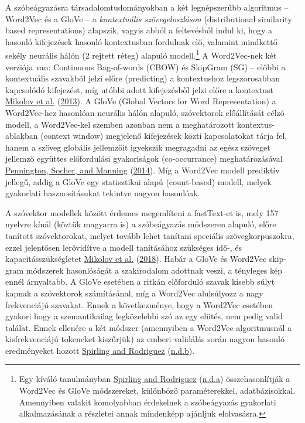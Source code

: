 \documentclass[
]{book}
\begin{document}
A szóbeágyazásra társadalomtudományokban a két legnépszerűbb algoritmus
-- Word2Vec és a GloVe -- a \emph{kontextuális szövegeloszláson}
(distributional similarity based representations) alapszik, vagyis abból
a feltevésből indul ki, hogy a hasonló kifejezések hasonló kontextusban
fordulnak elő, valamint mindkettő sekély neurális hálón (2 rejtett
réteg) alapuló modell.\footnote{Egy kíváló tanulmányban
  \protect\hyperlink{ref-spirlingword}{Spirling and Rodriguez}
  (\protect\hyperlink{ref-spirlingword}{n.d.a}) összehasonlítják a
  Word2Vec és GloVe módszereket, különbözö paraméterekkel,
  adatbázisokkal. Amennyiben valakit komolyabban érdekelnek a
  szóbeágyazás gyakorlati alkalmazásának a részletei annak mindenképp
  ajánljuk elolvasásra.} A Word2Vec-nek két verziója van: Continuous
Bag-of-words (CBOW) és SkipGram (SG) -- előbbi a kontextuális szavakból
jelzi előre (predicting) a kontextushoz legszorosabban kapcsolódó
kifejezést, míg utóbbi adott kifejezésből jelzi előre a kontextust
\protect\hyperlink{ref-mikolov2013efficient}{Mikolov et al.}
(\protect\hyperlink{ref-mikolov2013efficient}{2013}). A GloVe (Global
Vectors for Word Representation) a Word2Vec-hez hasonlóan neurális hálón
alapuló, szóvektorok előállítását célzó modell, a Word2Vec-kel szemben
azonban nem a meghatározott kontextus-ablakban (context window)
megjelenő kifejezések közti kapcsolatokat tárja fel, hanem a szöveg
globális jellemzőit igyekszik megragadni az egész szöveget jellemző
együttes előfordulási gyakoriságok (co-occurrance) meghatározásával
\protect\hyperlink{ref-pennington2014glove}{Pennington, Socher, and
Manning} (\protect\hyperlink{ref-pennington2014glove}{2014}). Míg a
Word2Vec modell prediktív jellegű, addig a GloVe egy statisztikai alapú
(count-based) modell, melyek gyakorlati hasznosításukat tekintve nagyon
hasonlóak.

A szóvektor modellek között érdemes megemlíteni a fastText-et is, mely
157 nyelvre kínál (köztük magyarra is) a szóbeágyazás módszeren alapuló,
előre tanított szóvektorokat, melyet tovább lehet tanítani speciális
szövegkorpuszokra, ezzel jelentősen lerövidítve a modell tanításához
szükséges idő-, és kapacitásszükségletet
\protect\hyperlink{ref-mikolov2018advances}{Mikolov et al.}
(\protect\hyperlink{ref-mikolov2018advances}{2018}). Habár a GloVe és
Word2Vec skip-gram módszerek hasonlóságát a szakirodalom adottnak veszi,
a tényleges kép ennél árnyaltabb. A GloVe esetében a ritkán előforduló
szavak kisebb súlyt kapnak a szóvektorok számításánal, míg a Word2Vec
alulsúlyozz a nagy frekvenciájú szavakat. Ennek a következménye, hogy a
Word2Vec esetében gyakori hogy a szemantikailag legközelebbi szó az egy
elütés, nem pedig valid találat. Ennek ellenére a két módszer
(amennyiben a Word2Vec algoritmusnál a kisfrekvenciájú tokeneket
kiszűrjük) az emberi validálás során nagyon hasonló eredményeket hozott
\protect\hyperlink{ref-spirlingworda}{Spirling and Rodriguez}
(\protect\hyperlink{ref-spirlingworda}{n.d.b}).
\end{document}
